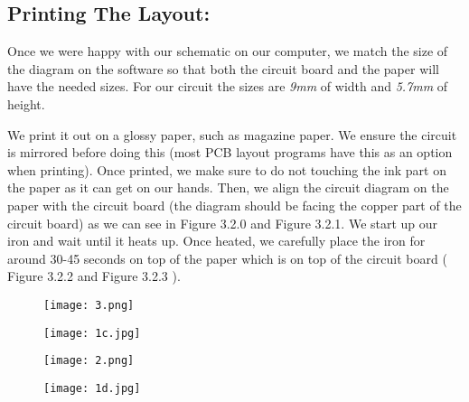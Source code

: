 \subsection{Printing The Layout:}

Once we were happy with our schematic on our computer, we match the size of the diagram on the software so that both the circuit board and the paper will have the needed sizes. For our circuit the sizes are {\itshape 9mm} of width and {\itshape 5.7mm} of height. \hfill \break

We print it out on a glossy paper, such as magazine paper. We ensure the circuit is mirrored before doing this (most PCB layout programs have this as an option when printing). Once printed, we make sure to do not touching the ink part on the paper as it can get on our hands. Then, we align the circuit diagram on the paper with the circuit board (the diagram should be facing the copper part of the circuit board) as we can see in Figure 3.2.0 and Figure 3.2.1. We start up our iron and wait until it heats up. Once heated, we carefully place the iron for around 30-45 seconds on top of the paper which is on top of the circuit board ( Figure 3.2.2 and Figure 3.2.3 ). \hfill \break

\begin{figure}[H]
\texttt{[image: 3.png]}
\centering \linebreak {}
\end{figure}

\begin{figure}[H]
\texttt{[image: 1c.jpg]}
\centering \linebreak {}
\end{figure}

\begin{figure}[H]
\texttt{[image: 2.png]}
\centering \linebreak {}
\end{figure} 

\begin{figure}[H]
\texttt{[image: 1d.jpg]}
\centering \linebreak {}
\end{figure}

\pagebreak